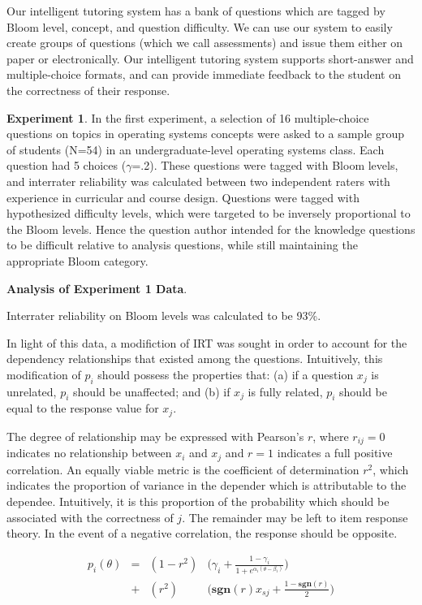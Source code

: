 \documentclass[a4paper,twocolumn]{article}
\begin{document}
Our intelligent tutoring system has a bank of questions which are tagged by
Bloom level, concept, and question difficulty.  We can use our system to easily
create groups of questions (which we call assessments) and issue them either on
paper or electronically.  Our intelligent tutoring system supports short-answer
and multiple-choice formats, and can provide immediate feedback to the student
on the correctness of their response.


\textbf{Experiment 1}. In the first experiment, a selection of 16
multiple-choice questions on topics in operating systems concepts were asked to
a sample group of students (N=54) in an undergraduate-level operating systems
class.  Each question had 5 choices ($\gamma$=.2). These questions were tagged
with Bloom levels, and interrater reliability was calculated between two
independent raters with experience in curricular and course design.  Questions
were tagged with hypothesized difficulty levels, which were targeted to be
inversely proportional to the Bloom levels.  Hence the question author intended
for the knowledge questions to be difficult relative to analysis questions,
while still maintaining the appropriate Bloom category.


\textbf{Analysis of Experiment 1 Data}.  

Interrater reliability on Bloom levels was calculated to be 93\%. 


In light of this data, a modifiction of IRT was sought in order to account for
the dependency relationships that existed among the questions.  Intuitively,
this modification of $p_i$ should possess the properties that: (a) if a
question $x_j$ is unrelated, $p_i$ should be unaffected; and (b) if $x_j$ is
fully related, $p_i$ should be equal to the response value for $x_j$. 

The degree of relationship may be expressed with Pearson's $r$, where
$r_{ij}=0$ indicates no relationship between $x_i$ and $x_j$ and $r=1$
indicates a full positive correlation.  An equally viable metric is the
coefficient of determination $r^2$, which indicates the proportion of variance
in the depender which is attributable to the dependee.  Intuitively, it is
this proportion of the probability which should be associated with the
correctness of $j$.  The remainder may be left to item response theory.
In the event of a negative correlation, the response should be opposite.


\begin{align*}
  p_i(\theta) &=& (1-r^2) & \Big(\gamma_i + \frac{1-\gamma_i}{1+e^{\alpha_i(\theta-\beta_i)}}\Big) \\
              &+& (r^2)   & \Big(\mathbf{sgn}(r)x_{sj}+\frac{1-\mathbf{sgn}(r)}{2}\Big)
\end{align*}
\end{document}
